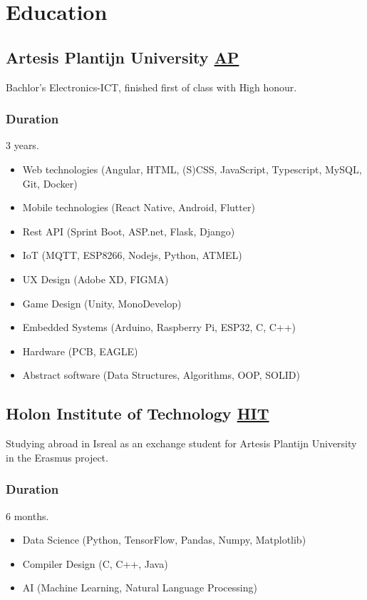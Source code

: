 \section{Educat\textcolor{mycolor}{ion}}
  \subsection{Artesis Plantijn University \href{https://ap.be}{AP}}
    \hspace*{\fill}{\textcolor{mygrey}{2017-2020}}

    Bachlor's Electronics-ICT, finished first of class with \textcolor{mycolor}{High honour}.
    \subsubsection{Duration}
      3 years.
      \begin{itemize}
        \item Web technologies (Angular, HTML, (S)CSS, JavaScript, Typescript, MySQL, Git, Docker)
        \item Mobile technologies (React Native, Android, Flutter)
        \item Rest API (Sprint Boot, ASP.net, Flask, Django)
        \item IoT (MQTT, ESP8266, Nodejs, Python, ATMEL)
        \item UX Design (Adobe XD, FIGMA)
        \item Game Design (Unity, MonoDevelop)
        \item Embedded Systems (Arduino, Raspberry Pi, ESP32, C, C++)
        \item Hardware (PCB, EAGLE)
        \item Abstract software (Data Structures, Algorithms, OOP, SOLID)
      \end{itemize}
  \subsection{Holon Institute of Technology \href{https://www.hit.ac.il/en}{HIT}}
    \hspace*{\fill}{\textcolor{mygrey}{2020}}

    Studying abroad in Isreal as an exchange student for Artesis Plantijn University in the Erasmus project.
    \subsubsection{Duration}
      6 months.
      \begin{itemize}
        \item Data Science (Python, TensorFlow, Pandas, Numpy, Matplotlib)
        \item Compiler Design (C, C++, Java)
        \item AI (Machine Learning, Natural Language Processing)
      \end{itemize}
